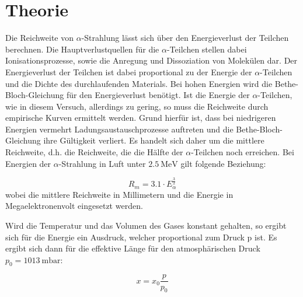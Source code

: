 \section{Theorie}
\label{sec:Theorie}

Die Reichweite von $\alpha$-Strahlung lässt sich über den Energieverlust der Teilchen berechnen.
Die Hauptverlustquellen für die $\alpha$-Teilchen stellen dabei Ionisationsprozesse, sowie die Anregung und Dissoziation von Molekülen dar.
Der Energieverlust der Teilchen ist dabei proportional zu der Energie der $\alpha$-Teilchen und die Dichte des durchlaufenden Materials.
Bei hohen Energien wird die Bethe-Bloch-Gleichung für den Energieverlust benötigt.
Ist die Energie der $\alpha$-Teilchen, wie in diesem Versuch, allerdings zu gering, so muss die Reichweite durch empirische Kurven ermittelt werden.
Grund hierfür ist, dass bei niedrigeren Energien vermehrt Ladungsaustauschprozesse auftreten und die Bethe-Bloch-Gleichung ihre Gültigkeit verliert.
Es handelt sich daher um die mittlere Reichweite, d.h. die Reichweite, die die Hälfte der $\alpha$-Teilchen noch erreichen.
Bei Energien der $\alpha$-Strahlung in Luft unter $\SI{2.5}{\mega\electronvolt}$ gilt folgende Beziehung:

\begin{equation}
  R_m = 3.1 \cdot E_{\alpha}^{\frac{3}{2}}
  \label{eqn:rm}
\end{equation}
wobei die mittlere Reichweite in Millimetern und die Energie in Megaelektronenvolt eingesetzt werden.

Wird die Temperatur und das Volumen des Gases konstant gehalten, so ergibt sich für die Energie ein Ausdruck, welcher proportional zum Druck p ist.
Es ergibt sich dann für die effektive Länge für den atmosphärischen Druck $p_0 = \SI{1013}{\milli\bar}$:

\begin{equation}
  x = x_0 \frac{p}{p_0}
  \label{eqn:xeff}
\end{equation}
